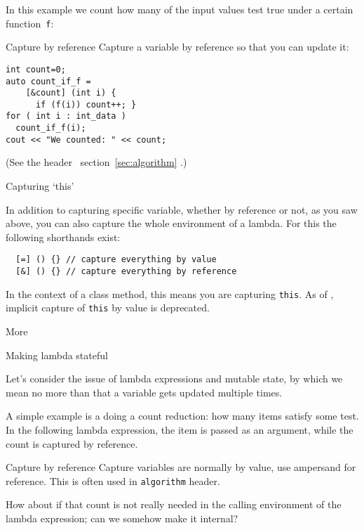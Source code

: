 In this example we count how many of the input values
test true under a certain function~\lstinline{f}:

\begin{block}{Capture by reference}
  \label{sl:capture-count}
  Capture a variable by reference so that
  you can update it:
\begin{lstlisting}
int count=0;
auto count_if_f = 
    [&count] (int i) {
      if (f(i)) count++; }
for ( int i : int_data )
  count_if_f(i);
cout << "We counted: " << count;
\end{lstlisting}
(See the  header%
\ifInBook ~section~\ref{sec:algorithm}\fi
.)
\end{block}

 {Capturing `this'}

In addition to capturing specific variable,
whether by reference or not,
as you saw above, you can also capture the whole
environment of a lambda.
For this the following shorthands exist:
\begin{lstlisting}
  [=] () {} // capture everything by value
  [&] () {} // capture everything by reference
\end{lstlisting}
In the context of a class method, this means you are capturing \lstinline{this}.
As of , implicit capture of \lstinline{this} by value
is deprecated.

 {More}

 {Making lambda stateful}

Let's consider the issue of lambda expressions and mutable state,
by which we mean no more than that a variable gets updated
multiple times.

A simple example is a doing a count reduction:
how many items satisfy some test.
In the following lambda expression, the item
is passed as an argument,
while the count is captured by reference.


\begin{slide}{Capture by reference}
  \label{sl:lambda-count}
  Capture variables are normally by value,
  use ampersand for reference.
  This is often used in \lstinline{algorithm} header.
\end{slide}

How about if that count is not really needed
in the calling environment of the lambda expression;
can we somehow make it internal?


